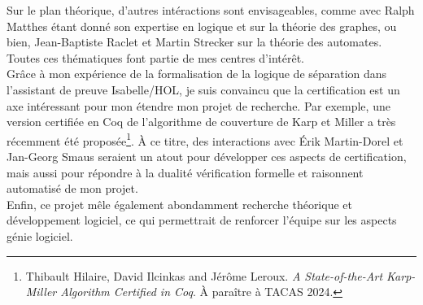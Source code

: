 Sur le plan théorique, d'autres intéractions sont envisageables, comme avec
Ralph Matthes étant donné son expertise en logique et sur la théorie des
graphes, ou bien, Jean-Baptiste Raclet et Martin Strecker sur la théorie des
automates. Toutes ces thématiques font partie de mes centres d'intérêt.\\

Grâce à mon expérience de la formalisation de la logique de séparation dans
l'assistant de preuve Isabelle/HOL, je suis convaincu que la certification est
un axe intéressant pour mon étendre mon projet de recherche. Par exemple, une
version certifiée en Coq de l'algorithme de couverture de Karp et Miller a très
récemment été proposée\footnote{ Thibault Hilaire, David Ilcinkas and Jérôme
Leroux. \textit{A State-of-the-Art Karp-Miller Algorithm Certified in Coq}. À
paraître à TACAS 2024.}. À ce titre, des interactions avec Érik Martin-Dorel et
Jan-Georg Smaus seraient un atout pour développer ces aspects de certification,
mais aussi pour répondre à la dualité vérification formelle et raisonnent automatisé de
mon projet.\\

Enfin, ce projet mêle également abondamment recherche théorique et
développement logiciel, ce qui permettrait de renforcer l'équipe sur les aspects
génie logiciel.\\



